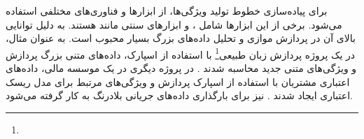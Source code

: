 برای پیاده‌سازی خطوط تولید ویژگی‌ها، از ابزارها و فناوری‌های مختلفی استفاده می‌شود. برخی از این ابزارها شامل ،  و ابزارهای  سنتی مانند  هستند.  به دلیل توانایی بالای آن در پردازش موازی و تحلیل داده‌های بزرگ بسیار محبوب است. به عنوان مثال، در یک پروژه پردازش زبان طبیعی\footnote{} با استفاده از اسپارک، داده‌های متنی بزرگ پردازش و ویژگی‌های متنی جدید محاسبه شدند \cite{MLOpsArchfeature1}. در پروژه دیگری در یک موسسه مالی، داده‌های اعتباری مشتریان با استفاده از اسپارک پردازش و ویژگی‌های مرتبط برای مدل ریسک اعتباری ایجاد شدند \cite{MLOpsArchfeature2}. 
 \cite{Kafka} نیز برای بارگذاری داده‌های جریانی بلادرنگ به کار گرفته می‌شود.











